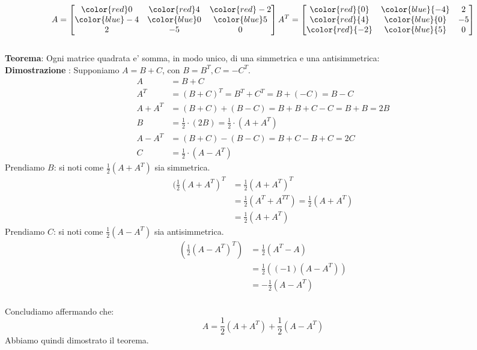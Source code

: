 \documentclass[a4paper, 10pt]{article}
\begin{document}
		\begin{align*}
			A = \begin{bmatrix}
					\color{red}0 & \color{red}4 & \color{red}-2 \\
					\color{blue}-4 & \color{blue}0 & \color{blue} 5 \\
					 2 & -5 & 0
 			\end{bmatrix}		
			A^T = \begin{bmatrix}
				\color{red}{0} & \color{blue}{-4} & 2 \\
				\color{red}{4} & \color{blue}{0} & -5 \\
				\color{red}{-2} & \color{blue}{5} & 0
			\end{bmatrix}
		\end{align*}
	\\
	\textbf{Teorema}: Ogni matrice quadrata e' somma, in modo unico, di una simmetrica e una antisimmetrica:\\
	\textbf{Dimostrazione} : Supponiamo $A = B + C$, con $B = B^T, C = -C^T$.
	\begin{equation*}
		\begin{split}
			A &= B + C \\
			A^T &= (B + C)^T = B^T + C^T = B + (-C) = B - C \\
			A + A^T &= (B + C) + (B - C) = B + B + C - C = B + B = 2B \\
			B &= \frac{1}{2} \cdot(2B) = \frac{1}{2} \cdot(A+A^T) \\
			A - A^T &= (B + C) - (B - C) = B + C - B + C = 2C \\
			C &= \frac{1}{2}\cdot(A - A^T)
		\end{split}
	\end{equation*}
	Prendiamo $B$: si noti come $\frac{1}{2}(A + A^T)$ sia simmetrica.
	\begin{equation*}
		\begin{split}
			(\frac{1}{2}(A+A^T)^T &= \frac{1}{2}(A+A^T)^T \\
			&= \frac{1}{2} (A^T + A^{TT}) = \frac{1}{2}(A+A^T)\\
			&= \frac{1}{2}(A+A^T)
		\end{split}
	\end{equation*}
	Prendiamo $C$: si noti come $\frac{1}{2}(A-A^T)$ sia antisimmetrica.
	\begin{equation*}
		\begin{split}
			(\frac{1}{2}(A-A^T)^T) &= \frac{1}{2}(A^T - A) \\
			&= \frac{1}{2}((-1)(A-A^T)) \\
			&= - \frac{1}{2}(A-A^T)
		\end{split}
	\end{equation*}
	\\
	Concludiamo affermando che: 
	\begin{equation*}
		A = \frac{1}{2}(A+A^T) + \frac{1}{2}(A-A^T)
	\end{equation*}
	Abbiamo quindi dimostrato il teorema.
	
\end{document}
